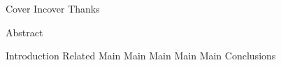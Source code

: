 \documentclass[12pt,a4paper,twoside]{book}
\renewcommand{\^}[1]{\ensuremath{\mathcal{#1}}}
\renewcommand{\^}[1]{\ensuremath{\mathcal{#1}}}
\begin{document}
\frontmatter

\pagestyle{empty}
\frenchspacing
\setcounter{page}{-11}
{Cover}
{Incover}
\thispagestyle{empty}
{Thanks}

{Abstract}

\pagestyle{headings}
\tableofcontents
\listoffigures

\mainmatter

{Introduction}
{Related}
{Main}
{Main}
{Main}
{Main}
{Main}
{Conclusions}

\newpage{}

\end{document}

